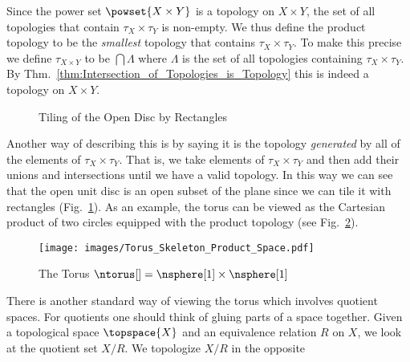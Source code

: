 \documentclass[oneside]{book}                                                  %
\begin{document}
                Since the power set $\powset{X\times{Y}}$ is a topology on
                $X\times{Y}$, the set of all topologies that contain
                $\tau_{X}\times\tau_{Y}$ is non-empty. We thus define the
                product topology to be the \textit{smallest} topology that
                contains $\tau_{X}\times\tau_{Y}$. To make this precise we
                define $\tau_{X\times{Y}}$ to be $\bigcap\Lambda$ where
                $\Lambda$ is the set of all topologies containing
                $\tau_{X}\times\tau_{Y}$. By
                Thm.~\ref{thm:Intersection_of_Topologies_is_Topology} this is
                indeed a topology on $X\times{Y}$.
                \begin{figure}[H]
                    \centering
                    \captionsetup{type=figure}
                    
                    \caption{Tiling of the Open Disc by Rectangles}
                    \label{fig:Tiling_Open_Disc_by_Rectangles}
                \end{figure}
                Another way of describing this is by saying it is the topology
                \textit{generated} by all of the elements of
                $\tau_{X}\times\tau_{Y}$. That is, we take elements of
                $\tau_{X}\times\tau_{Y}$ and then add their unions and
                intersections until we have a valid topology. In this way we
                can see that the open unit disc is an open subset of the plane
                since we can tile it with rectangles
                (Fig.~\ref{fig:Tiling_Open_Disc_by_Rectangles}).
                As an example, the torus can be viewed as the Cartesian product
                of two circles equipped with the product topology
                (see Fig.~\ref{fig:Torus_as_Prod_Space}).
                \begin{figure}[H]
                    \centering
                    \captionsetup{type=figure}
                    \texttt{[image: images/Torus\_Skeleton\_Product\_Space.pdf]}
                    \caption{The Torus $\ntorus[]=\nsphere[1]\times\nsphere[1]$}
                    \label{fig:Torus_as_Prod_Space}
                \end{figure}
                There is another standard way of viewing the torus which
                involves quotient spaces. For quotients one should think of
                gluing parts of a space together. Given a topological space
                $\topspace{X}$ and an equivalence relation $R$ on $X$, we look
                at the quotient set $X/R$. We topologize $X/R$ in the opposite
\end{document}
